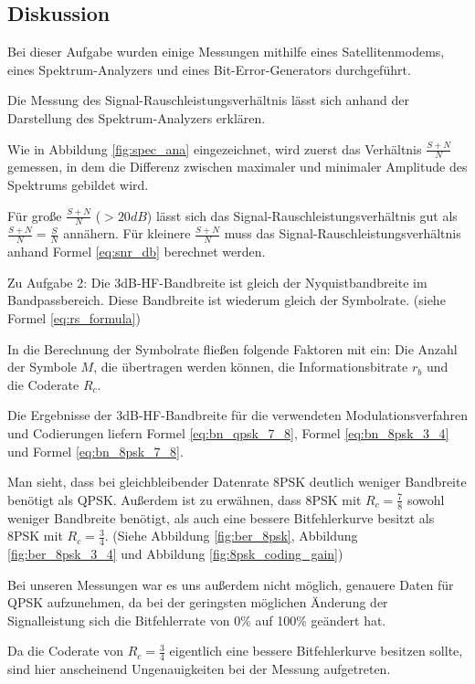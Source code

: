 \documentclass[12pt,a4paper,ngerman]{article}
\begin{document}
	\clearpage
\subsection{Diskussion}
Bei dieser Aufgabe wurden einige Messungen mithilfe eines Satellitenmodems, eines Spektrum-Analyzers und eines Bit-Error-Generators durchgeführt.

Die Messung des Signal-Rauschleistungsverhältnis lässt sich anhand der Darstellung des Spektrum-Analyzers erklären.

Wie in Abbildung \ref{fig:spec_ana} eingezeichnet, wird zuerst das Verhältnis $\frac{S+N}{N}$ gemessen, in dem die Differenz zwischen maximaler und minimaler Amplitude des Spektrums gebildet wird.

Für große $\frac{S+N}{N}$ ($>20dB$) lässt sich das Signal-Rauschleistungsverhältnis gut als $\frac{S+N}{N} = \frac{S}{N}$ annähern. Für kleinere $\frac{S+N}{N}$ muss das Signal-Rauschleistungsverhältnis anhand Formel \ref{eq:snr_db} berechnet werden. 

Zu Aufgabe 2: Die 3dB-HF-Bandbreite ist gleich der Nyquistbandbreite im Bandpassbereich. Diese Bandbreite ist wiederum gleich der Symbolrate. (siehe Formel \ref{eq:rs_formula})

In die Berechnung der Symbolrate fließen folgende Faktoren mit ein: Die Anzahl der Symbole $M$, die übertragen werden können, die Informationsbitrate $r_b$ und die Coderate $R_c$.

Die Ergebnisse der 3dB-HF-Bandbreite für die verwendeten Modulationsverfahren und Codierungen liefern Formel \ref{eq:bn_qpsk_7_8}, Formel \ref{eq:bn_8psk_3_4} und Formel \ref{eq:bn_8psk_7_8}.

Man sieht, dass bei gleichbleibender Datenrate 8PSK deutlich weniger Bandbreite benötigt als QPSK. Außerdem ist zu erwähnen, dass 8PSK mit $R_c = \frac{7}{8}$ sowohl weniger Bandbreite benötigt, als auch eine bessere Bitfehlerkurve besitzt als 8PSK mit $R_c = \frac{3}{4}$.
(Siehe Abbildung \ref{fig:ber_8psk}, Abbildung \ref{fig:ber_8psk_3_4} und Abbildung \ref{fig:8psk_coding_gain})

Bei unseren Messungen war es uns außerdem nicht möglich, genauere Daten für QPSK aufzunehmen, da bei der geringsten möglichen Änderung der Signalleistung sich die Bitfehlerrate von 0\% auf 100\% geändert hat.

Da die Coderate von $R_c = \frac{3}{4}$ eigentlich eine bessere Bitfehlerkurve besitzen sollte, sind hier anscheinend Ungenauigkeiten bei der Messung aufgetreten.
\end{document}
